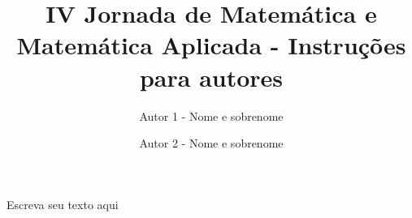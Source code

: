 \documentclass[a4paper, twoside]{article}
\title{IV Jornada de Matemática e Matemática Aplicada - Instruções para autores}
\author[1]{Autor 1 - Nome e sobrenome}
\author[2]{Autor 2 - Nome e sobrenome}
\affil[1]{Afiliação autor 1}
\affil[2]{Afiliação autor 2}
\date{}
\begin{document}
\maketitle
\thispagestyle{firstpage}






Escreva seu texto aqui



\renewcommand{\refname}{Referências Bibliográficas}


\end{document}
